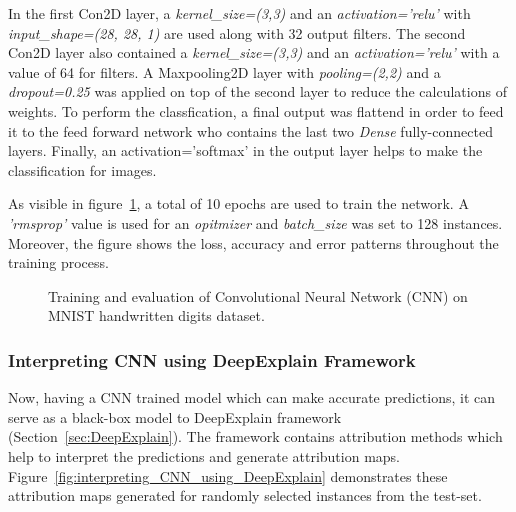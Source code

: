 \documentclass[english]{tktltiki2}
\theoremstyle{definition}
\theoremstyle{remark}
\begin{document}
In the first Con2D layer, a\textit{ kernel\_size=(3,3)} and an \textit{activation='relu'} with \textit{input\_shape=(28, 28, 1)} are used along with 32 output filters. The second Con2D layer also contained a \textit{kernel\_size=(3,3)} and an \textit{activation='relu'} with a value of 64 for filters. A Maxpooling2D layer with \textit{pooling=(2,2)} and a \textit{dropout=0.25} was applied on top of the second layer to reduce the calculations of weights. To perform the classfication, a final output was flattend in order to feed it to the feed forward network who contains the last two \textit{Dense} fully-connected layers. Finally, an activation='softmax' in the output layer helps to make the classification for images.

As visible in figure~\ref{fig:cnn_training_plots}, a total of 10 epochs are used to train the network. A \textit{'rmsprop'} value is used for an \textit{opitmizer} and \textit{batch\_size} was set to 128 instances. Moreover, the figure shows the loss, accuracy and error patterns throughout the training process.

\begin{figure}[H]
	\centering
	\hspace*{\fill}%
	\qquad
	\caption{Training and evaluation of Convolutional Neural Network (CNN) on MNIST handwritten digits dataset.}%
	\label{fig:cnn_training_plots}%
\end{figure}

\subsubsection{Interpreting CNN using DeepExplain Framework}
Now, having a CNN trained model which can make accurate predictions, it can serve as a black-box model to DeepExplain framework (Section~\ref{sec:DeepExplain}). The framework contains attribution methods which help to interpret the predictions and generate attribution maps. Figure~\ref{fig:interpreting_CNN_using_DeepExplain} demonstrates these attribution maps generated for randomly selected instances from the test-set.
\end{document}

